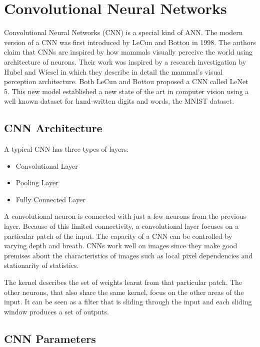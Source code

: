 \section{Convolutional Neural Networks}
Convolutional Neural Networks (CNN) is a special kind of ANN. The modern version of a CNN was first introduced by LeCun and Bottou \cite{LeCun1998Gradient-basedRecognition} in 1998. The authors claim that CNNs are inspired by how mammals visually perceive the world using architecture of neurons. Their work was inspired by a research investigation by Hubel and Wiesel \cite{Hubel1968ReceptiveCortex.} in which they describe in detail the mammal's visual perception architecture. Both LeCun and Bottou proposed a CNN called LeNet 5. This new model established a new state of the art in computer vision using a well known dataset for hand-written digits and words, the MNIST \cite{LeCun2010MNISTDatabase} dataset.



\subsection{CNN Architecture}
A typical CNN has three types of layers:

\begin{itemize}
	\item 
Convolutional Layer
	\item 
Pooling Layer
	\item 
Fully Connected Layer
\end{itemize}

A convolutional neuron is connected with just a few neurons from the previous layer. Because of this limited connectivity, a convolutional layer focuses on a particular patch of the input. The capacity of a CNN can be controlled by varying depth and breath. CNNs work well on images since they make good premises about the characteristics of images such as local pixel dependencies and stationarity of statistics. \cite{KrizhevskyImageNetNetworks}

The kernel describes the set of weights learnt from that particular patch. The other neurons, that also share the same kernel, focus on the other areas of the input. It can be seen as a filter that is sliding through the input and each sliding window produces a set of outputs.



\subsection{CNN Parameters}